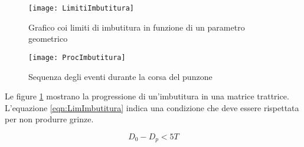 \begin{figure}
\centering
\texttt{[image: LimitiImbutitura]}
\caption{Grafico coi limiti di imbutitura in funzione di un parametro geometrico}
\label{fig:LimitiImbutitura}
\texttt{[image: ProcImbutitura]}
\caption{Sequenza degli eventi durante la corsa del punzone}
\label{fig:ProcImbutitura}
\end{figure}

Le figure \ref{fig:ProcImbutitura} mostrano la progressione di un'imbutitura in una matrice trattrice.
L'equazione \eqref{eqn:LimImbutitura} indica una condizione che deve essere rispettata per non produrre grinze.

\begin{equation}
D_0 - D_p < 5T
\label{eqn:LimImbutitura}
\end{equation}


